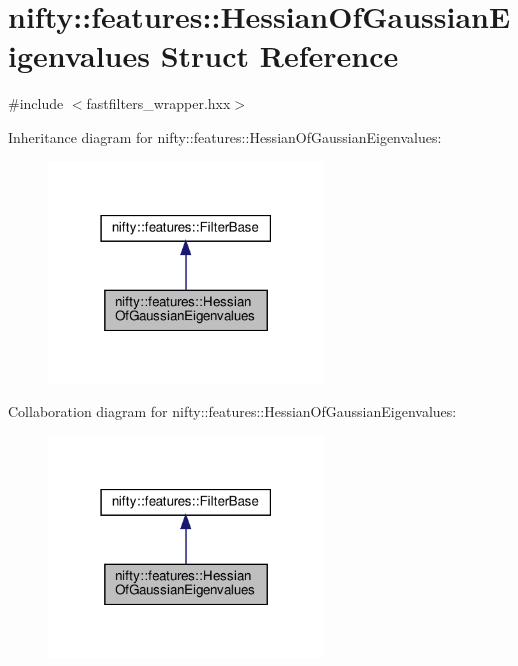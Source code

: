 \hypertarget{structnifty_1_1features_1_1HessianOfGaussianEigenvalues}{}\section{nifty\+:\+:features\+:\+:Hessian\+Of\+Gaussian\+Eigenvalues Struct Reference}
\label{structnifty_1_1features_1_1HessianOfGaussianEigenvalues}


{\ttfamily \#include $<$fastfilters\+\_\+wrapper.\+hxx$>$}



Inheritance diagram for nifty\+:\+:features\+:\+:Hessian\+Of\+Gaussian\+Eigenvalues\+:
\nopagebreak
\begin{figure}[H]
\begin{center}
\leavevmode
\includegraphics[width=207pt]{structnifty_1_1features_1_1HessianOfGaussianEigenvalues__inherit__graph}
\end{center}
\end{figure}


Collaboration diagram for nifty\+:\+:features\+:\+:Hessian\+Of\+Gaussian\+Eigenvalues\+:
\nopagebreak
\begin{figure}[H]
\begin{center}
\leavevmode
\includegraphics[width=207pt]{structnifty_1_1features_1_1HessianOfGaussianEigenvalues__coll__graph}
\end{center}
\end{figure}
